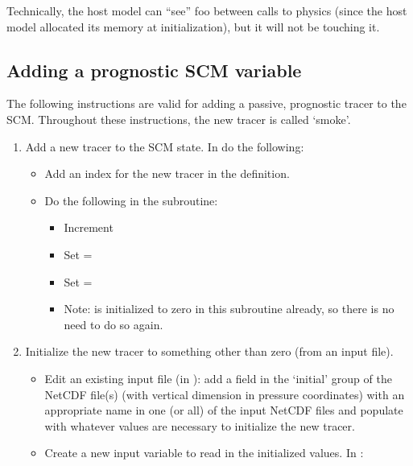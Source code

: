 Technically, the host model can ``see'' foo between calls to physics (since the host model allocated its memory at initialization), but it will not be touching it.

\subsection{Adding a prognostic SCM variable}

The following instructions are valid for adding a passive, prognostic tracer to the SCM. Throughout these instructions, the new tracer is called `smoke'.

\begin{enumerate}
\item Add a new tracer to the SCM state. In  do the following:
	\begin{itemize}
	\item Add an index for the new tracer in the  definition.
	\item Do the following in the  subroutine:
		\begin{itemize}
		\item Increment 
		\item Set  = 
		\item Set  = 
		\item Note:  is initialized to zero in this subroutine already, so there is no need to do so again.
		\end{itemize}
	\end{itemize}
\item Initialize the new tracer to something other than zero (from an input file).
	\begin{itemize}
	\item Edit an existing input file (in ): add a field in the `initial' group of the NetCDF file(s) (with vertical dimension in pressure coordinates) with an appropriate name in one (or all) of the input NetCDF files and populate with whatever values are necessary to initialize the new tracer.
	\item Create a new input variable to read in the initialized values. In :
		\begin{itemize}

\end{itemize}
\end{itemize}
\end{enumerate}
